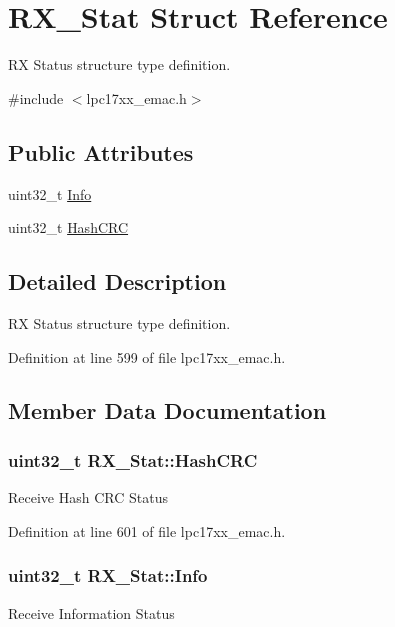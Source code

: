 \hypertarget{struct_r_x___stat}{\section{\-R\-X\-\_\-\-Stat \-Struct \-Reference}
\label{struct_r_x___stat}
}


\-R\-X \-Status structure type definition.  




{\ttfamily \#include $<$lpc17xx\-\_\-emac.\-h$>$}

\subsection*{\-Public \-Attributes}
\begin{DoxyCompactItemize}
\item 
uint32\-\_\-t \hyperlink{struct_r_x___stat_ad12f580a962b80432f0f89d812b38206}{\-Info}
\item 
uint32\-\_\-t \hyperlink{struct_r_x___stat_aecd97d6a26f68c514628a236cd1dce26}{\-Hash\-C\-R\-C}
\end{DoxyCompactItemize}


\subsection{\-Detailed \-Description}
\-R\-X \-Status structure type definition. 

\-Definition at line 599 of file lpc17xx\-\_\-emac.\-h.



\subsection{\-Member \-Data \-Documentation}
\hypertarget{struct_r_x___stat_aecd97d6a26f68c514628a236cd1dce26}{
\subsubsection[{\-Hash\-C\-R\-C}]{\setlength{\rightskip}{0pt plus 5cm}uint32\-\_\-t {\bf \-R\-X\-\_\-\-Stat\-::\-Hash\-C\-R\-C}}}\label{struct_r_x___stat_aecd97d6a26f68c514628a236cd1dce26}
\-Receive \-Hash \-C\-R\-C \-Status 

\-Definition at line 601 of file lpc17xx\-\_\-emac.\-h.

\hypertarget{struct_r_x___stat_ad12f580a962b80432f0f89d812b38206}{
\subsubsection[{\-Info}]{\setlength{\rightskip}{0pt plus 5cm}uint32\-\_\-t {\bf \-R\-X\-\_\-\-Stat\-::\-Info}}}\label{struct_r_x___stat_ad12f580a962b80432f0f89d812b38206}
\-Receive \-Information \-Status 

